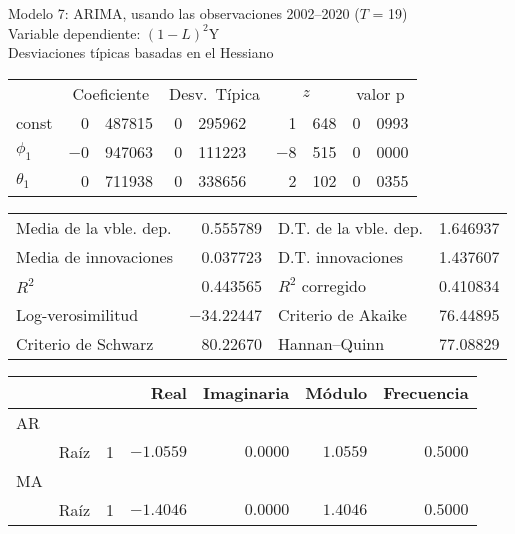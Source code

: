 \documentclass[11pt]{article}
\begin{document}
\thispagestyle{empty}

\begin{center}

Modelo 7: ARIMA, usando las observaciones 2002--2020 ($T$ = 19)\\
Variable dependiente: $(1-L)^2$Y\\
Desviaciones típicas basadas en el Hessiano

\vspace{1em}

\begin{tabular}{lr@{.}lr@{.}lr@{.}lr@{.}l}
  &
 \multicolumn{2}{c}{Coeficiente} &
  \multicolumn{2}{c}{Desv.\ Típica} &
   \multicolumn{2}{c}{$z$} &
    \multicolumn{2}{c}{valor p} \\[1ex]
const &
  0&487815 &
    0&295962 &
      1&648 &
        0&0993 \\
$\phi_{1}$ &
  $-$0&947063 &
    0&111223 &
      $-$8&515 &
        0&0000 \\
$\theta_{1}$ &
  0&711938 &
    0&338656 &
      2&102 &
        0&0355 \\
\end{tabular}

\vspace{1ex}
\begin{tabular}{lrlr}
Media de la vble. dep. &  0.555789 & D.T. de la vble. dep. &  1.646937 \\
Media de innovaciones &  0.037723 & D.T. innovaciones &  1.437607 \\
$R^2$ &  0.443565 & $R^2$ corregido &  0.410834 \\
Log-verosimilitud & $-$34.22447 & Criterio de Akaike &  76.44895 \\
Criterio de Schwarz &  80.22670 & Hannan--Quinn &  77.08829 \\
\end{tabular}


\vspace{1em}

\begin{tabular}{llrrrrr}
& & & Real & Imaginaria & Módulo & Frecuencia \\ \hline
AR \\ 
& Raíz & 1 & $-1.0559$ & $0.0000$ & $1.0559$ & $0.5000$ \\ 
MA \\ 
& Raíz & 1 & $-1.4046$ & $0.0000$ & $1.4046$ & $0.5000$ \\ \hline
\end{tabular}

\end{center}
\end{document}
